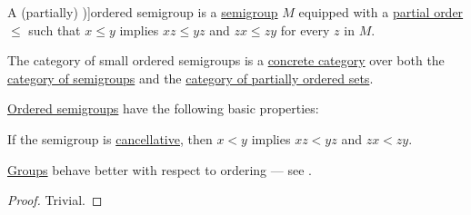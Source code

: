 \begin{definition}\label{def:ordered_semigroup}
  A (partially) \term[ru=частично упорядоченная полугруппа (\cite[535]{Ляпин1960Полугруппы})]{ordered semigroup} is a \hyperref[def:semigroup]{semigroup} \( M \) equipped with a \hyperref[def:partially_ordered_set]{partial order} \( \leq \) such that \( x \leq y \) implies \( xz \leq yz \) and \( zx \leq zy \) for every \( z \) in \( M \).
\end{definition}
\begin{comments}
  \item The category of small ordered semigroups is a \hyperref[def:concrete_category]{concrete category} over both the \hyperref[def:semigroup/category]{category of semigroups} and the \hyperref[def:partially_ordered_set]{category of partially ordered sets}.
\end{comments}

\begin{proposition}\label{thm:def:ordered_semigroup}
  \hyperref[def:ordered_semigroup]{Ordered semigroups} have the following basic properties:
  \begin{thmenum}
     If the semigroup is \hyperref[def:binary_operation/cancellative]{cancellative}, then \( x < y \) implies \( xz < yz \) and \( zx < zy \).
  \end{thmenum}
\end{proposition}
\begin{comments}
  \item \hyperref[def:group]{Groups} behave better with respect to ordering --- see .
\end{comments}
\begin{proof}
   Trivial.
\end{proof}

